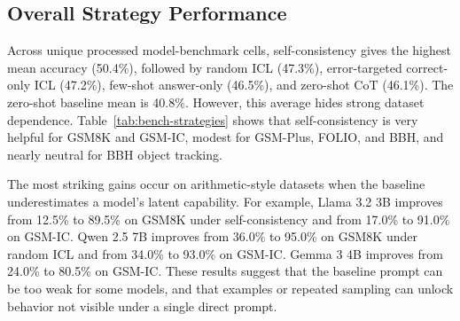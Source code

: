 \documentclass[10pt,twocolumn]{article}
\begin{document}
\subsection{Overall Strategy Performance}
Across unique processed model-benchmark cells, self-consistency gives the highest mean accuracy (50.4\%), followed by random ICL (47.3\%), error-targeted correct-only ICL (47.2\%), few-shot answer-only (46.5\%), and zero-shot CoT (46.1\%). The zero-shot baseline mean is 40.8\%. However, this average hides strong dataset dependence. Table~\ref{tab:bench-strategies} shows that self-consistency is very helpful for GSM8K and GSM-IC, modest for GSM-Plus, FOLIO, and BBH, and nearly neutral for BBH object tracking.

\begin{table}[t]
\centering
\caption{Mean accuracy by benchmark and selected strategy, averaged over unique processed model-benchmark cells after averaging duplicate rows. FOLIO uses 183 examples; other rows use 200 examples per model-benchmark run.}
\label{tab:bench-strategies}
\end{table}

The most striking gains occur on arithmetic-style datasets when the baseline underestimates a model's latent capability. For example, Llama 3.2 3B improves from 12.5\% to 89.5\% on GSM8K under self-consistency and from 17.0\% to 91.0\% on GSM-IC. Qwen 2.5 7B improves from 36.0\% to 95.0\% on GSM8K under random ICL and from 34.0\% to 93.0\% on GSM-IC. Gemma 3 4B improves from 24.0\% to 80.5\% on GSM-IC. These results suggest that the baseline prompt can be too weak for some models, and that examples or repeated sampling can unlock behavior not visible under a single direct prompt.
\end{document}
